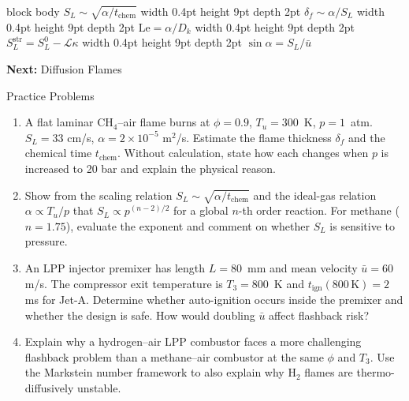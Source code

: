 \documentclass[12pt,aspectratio=169]{beamer}
\newcommand{\SL}{S_L}
\newcommand{\lf}{\delta_f}
\newcommand{\tchem}{t_{\text{chem}}}
\newcommand{\alphath}{\alpha}
\begin{document}
{\begin{frame}[plain, c]
  \vspace{0.30cm}

  \begin{beamercolorbox}[rounded=true,wd=\textwidth,
                         sep=5pt,center]{block body}
    \color{skyblue!80}\fontsize{7.8}{10}\selectfont
    $S_L \sim \sqrt{\alpha/t_{\text{chem}}}$
    \qquad\vrule width 0.4pt height 9pt depth 2pt\qquad
    $\delta_f \sim \alpha/S_L$
    \qquad\vrule width 0.4pt height 9pt depth 2pt\qquad
    $\mathrm{Le} = \alpha/D_k$
    \qquad\vrule width 0.4pt height 9pt depth 2pt\qquad
    $S_L^{\text{str}} = S_L^0 - \mathcal{L}\kappa$
    \qquad\vrule width 0.4pt height 9pt depth 2pt\qquad
    $\sin\alpha = S_L/\bar{u}$
  \end{beamercolorbox}

  \vspace{0.22cm}
  \begin{center}
    {\color{white!50}\fontsize{7.5}{9}\selectfont
     \textbf{Next:}\enspace
       Diffusion Flames}
  \end{center}

\end{frame}
}

\appendix
\begin{frame}{Practice Problems}
  \begin{enumerate}
    \item A flat laminar CH$_4$--air flame burns at $\phi = 0.9$,
          $T_u = 300$~K, $p = 1$~atm.
          $\SL = 33$ cm/s, $\alphath = 2\times10^{-5}$ m$^2$/s.
          Estimate the flame thickness $\lf$ and the chemical
          time $\tchem$.
          Without calculation, state how each changes when
          $p$ is increased to 20 bar and explain the physical reason.

    \item Show from the scaling relation
          $\SL \sim \sqrt{\alphath/\tchem}$
          and the ideal-gas relation $\alphath \propto T_u/p$
          that $\SL \propto p^{(n-2)/2}$ for a global
          $n$-th order reaction.
          For methane ($n = 1.75$), evaluate the exponent
          and comment on whether $\SL$ is sensitive to pressure.

    \item An LPP injector premixer has length $L = 80$~mm and
          mean velocity $\bar{u} = 60$ m/s.
          The compressor exit temperature is $T_3 = 800$~K and
          $t_{\text{ign}}(800\,\text{K}) = 2$ ms for Jet-A.
          Determine whether auto-ignition occurs inside the
          premixer and whether the design is safe.
          How would doubling $\bar{u}$ affect flashback risk?

    \item Explain why a hydrogen--air LPP combustor faces
          a more challenging flashback problem than a
          methane--air combustor at the same $\phi$ and $T_3$.
          Use the Markstein number framework to also explain
          why H$_2$ flames are thermo-diffusively unstable.
  \end{enumerate}
\end{frame}
\end{document}
